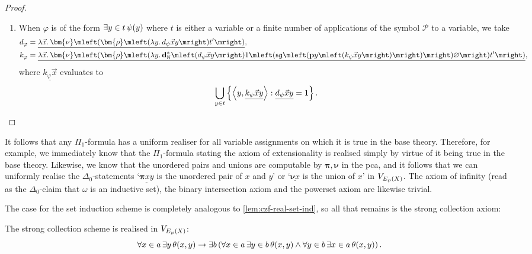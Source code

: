 \documentclass[12pt,openany]{book}
\theoremstyle{plain}
\theoremstyle{definition}
\newcommand\uplabel[1]{\textup{(#1)}}
\newcommand\tuple[1]{\left\langle #1 \right\rangle}
\newcommand\opA[1]{\mathop{\forall #1}}
\newcommand\opE[1]{\mathop{\exists #1}}
\newcommand\oplam[1]{\mathop{\lambda #1.}}
\newcommand\Pow{\mathcal{P}}
\newcommand\bp{\mathbf{p}}
\newcommand\bdN{\mathbf{d}_\mathbb{N}}
\begin{document}
\begin{proof}
\begin{enumerate}[label=\uplabel{\arabic*}]
    \item \label{itm:ep-real-delta0-correctness-exist} When $\varphi$ is of the form $\opE{y \in t} \psi\mleft(y\mright)$ where $t$ is either a variable or a finite number of applications of the symbol $\Pow$ to a variable, we take
          \begin{align*}
            d_\varphi & = \underline{\oplam{\vec{x}} \bm{\nu} \mleft(\bm{\rho} \mleft(\oplam{y} d_\psi \vec{x} y\mright) t'\mright)},                                                                                                                       \\
            k_\varphi & = \underline{\oplam{\vec{x}} \bm{\nu} \mleft(\bm{\rho} \mleft(\oplam{y} \bdN^* \mleft(d_\psi \vec{x} y\mright) 1 \mleft(\mathfrak{sg} \mleft(\bp y \mleft(k_\psi \vec{x} y\mright)\mright)\mright) \varnothing\mright) t'\mright)},
          \end{align*}
          where $\underline{k_\varphi \vec{x}}$ evaluates to
          \[\bigcup_{y \in t} \left\{\tuple{y, \underline{k_\psi \vec{x} y}} : \underline{d_\psi \vec{x} y} = 1\right\}. \qedhere\]
  \end{enumerate}
\end{proof}

It follows that any $\Pi_1$-formula has a uniform realiser for all variable assignments on which it is true in the base theory. Therefore, for example, we immediately know that the $\Pi_1$-formula stating the axiom of extensionality is realised simply by virtue of it being true in the base theory. Likewise, we know that the unordered pairs and unions are computable by $\bm{\pi}, \bm{\nu}$ in the pca, and it follows that we can uniformly realise the $\Delta_0$-statements `$\underline{\bm{\pi} xy}$ is the unordered pair of $x$ and $y$' or `$\underline{\bm{\nu} x}$ is the union of $x$' in $V_{E_\wp\mleft(X\mright)}$. The axiom of infinity (read as the $\Delta_0$-claim that $\omega$ is an inductive set), the binary intersection axiom and the powerset axiom are likewise trivial.

The case for the set induction scheme is completely analogous to \autoref{lem:czf-real-set-ind}, so all that remains is the strong collection axiom:
\begin{lemma}
  \label{lem:ep-real-str-coll}
  The strong collection scheme is realised in $V_{E_\wp\mleft(X\mright)}$:
  \[\opA{x \in a} \opE{y} \theta\mleft(x, y\mright) \rightarrow \opE{b} \left(\opA{x \in a} \opE{y \in b} \theta\mleft(x, y\mright) \land \opA{y \in b} \opE{x \in a} \theta\mleft(x, y\mright)\right).\]
\end{lemma}
\end{document}
